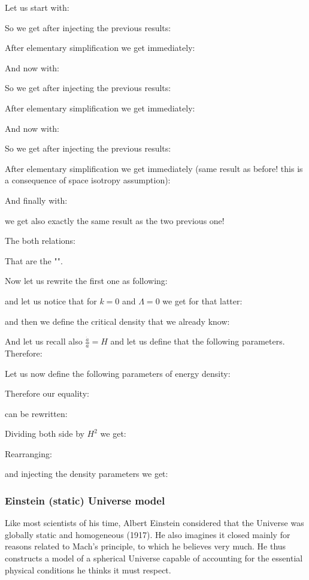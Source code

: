 	Let us start with:
	
	So we get after injecting the previous results:
	
	After elementary simplification we get immediately:
	
	And now with:
	
	So we get after injecting the previous results:
	
	After elementary simplification we get immediately:
	
	
	And now with:
	
	So we get after injecting the previous results:
	
	After elementary simplification we get immediately (same result as before! this is a consequence of space isotropy assumption):
	
	
	And finally with:
	
	we get also exactly the same result as the two previous one!
	
	The both relations:
	
	That are the "".
	
	Now let us rewrite the first one as following:
	
	and let us notice that for $k=0$ and $\Lambda=0$ we get for that latter:
	
	and then we define the critical density that we already know:
	
	And let us recall also $\frac{\dot{a}}{a}=H$ and let us define that the following parameters. Therefore:
	
	Let us now define the following parameters of energy density:
	
	Therefore our equality:
	
	can be rewritten:
	
	Dividing both side by $H^2$ we get:
	
	Rearranging:
	
	and injecting the density parameters we get:
	
	
	\subsubsection{Einstein (static) Universe model}\label{einstein static universe model}
	Like most scientists of his time, Albert Einstein considered that the Universe was globally static and homogeneous (1917). He also imagines it closed mainly for reasons related to Mach's principle, to which he believes very much. He thus constructs a model of a spherical Universe capable of accounting for the essential physical conditions he thinks it must respect.

